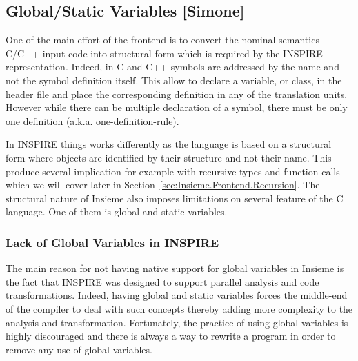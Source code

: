 \subsection{Global/Static Variables [Simone]}
\label{sec:Insieme.Frontend.Global}

One of the main effort of the frontend is to convert the nominal semantics C/C++
input code into structural form which is required by the INSPIRE representation.
Indeed, in C and C++ symbols are addressed by the name and not the symbol
definition itself. This allow to declare a variable, or class, in the header
file and place the corresponding definition in any of the translation units.
However while there can be multiple declaration of a symbol, there must be only
one definition (a.k.a. one-definition-rule). 

In INSPIRE things works differently as the language is based on a structural
form where objects are identified by their structure and not their name. This
produce several implication for example with recursive types and function calls
which we will cover later in Section~\ref{sec:Insieme.Frontend.Recursion}. The
structural nature of Insieme also imposes limitations on several feature of the
C language. One of them is global and static variables. 

\subsubsection{Lack of Global Variables in INSPIRE}
The main reason for not having native support for global variables in Insieme is
the fact that INSPIRE was designed to support parallel analysis and code
transformations. Indeed, having global and static variables forces the
middle-end of the compiler to deal with such concepts thereby adding more
complexity to the analysis and transformation. Fortunately, the practice of
using global variables is highly discouraged and there is always a way to
rewrite a program in order to remove any use of global variables. 




